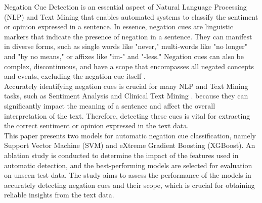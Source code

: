 
Negation Cue Detection is an essential aspect of Natural Language Processing (NLP) and Text Mining that enables automated systems to classify the sentiment or opinion expressed in a sentence. In essence, negation cues are linguistic markers that indicate the presence of negation in a sentence. They can manifest in diverse forms, such as single words like "never," multi-words like "no longer" and "by no means," or affixes like "im-" and "-less." Negation cues can also be complex, discontinuous, and have a scope that encompasses all negated concepts and events, excluding the negation cue itself \cite{jbara-2012}.
\\

Accurately identifying negation cues is crucial for many NLP and Text Mining tasks, such as Sentiment Analysis \cite{cruz2016machine} and Clinical Text Mining \cite{mehrabi2015deepen}. because they can significantly impact the meaning of a sentence and affect the overall interpretation of the text. Therefore, detecting these cues is vital for extracting the correct sentiment or opinion expressed in the text data.
\\

This paper presents two models for automatic negation cue classification, namely Support Vector Machine (SVM) and eXtreme Gradient Boosting (XGBoost). An ablation study is conducted to determine the impact of the features used in automatic detection, and the best-performing models are selected for evaluation on unseen test data. The study aims to assess the performance of the models in accurately detecting negation cues and their scope, which is crucial for obtaining reliable insights from the text data.



